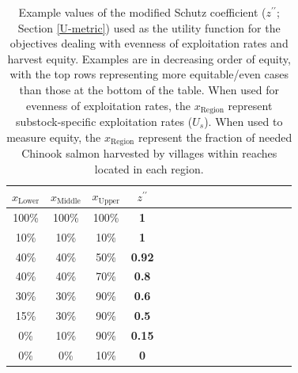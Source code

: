 \documentclass[12pt,]{book}
\theoremstyle{definition}
\theoremstyle{definition}
\theoremstyle{definition}
\theoremstyle{remark}
\begin{document}
\begin{singlespace}
\begin{table}
\caption{\label{tab:schutz-table}Example values of the modified Schutz coefficient ($z^{\prime\prime}$; Section \ref{U-metric}) used as the utility function for the objectives dealing with evenness of exploitation rates and harvest equity. Examples are in decreasing order of equity, with the top rows representing more equitable/even cases than those at the bottom of the table. When used for evenness of exploitation rates, the $x_{\text{Region}}$ represent substock-specific exploitation rates ($U_s$). When used to measure equity, the  $x_{\text{Region}}$ represent the fraction of needed Chinook salmon harvested by villages within reaches located in each region.}
\centering
\begin{tabular}[t]{ccc>{\bfseries}ccccccccccccc}
\toprule
$x_{\text{Lower}}$ & $x_{\text{Middle}}$ & $x_{\text{Upper}}$ & $z^{\prime\prime}$\\
\midrule
100\% & 100\% & 100\% & 1\\
10\% & 10\% & 10\% & 1\\
40\% & 40\% & 50\% & 0.92\\
40\% & 40\% & 70\% & 0.8\\
30\% & 30\% & 90\% & 0.6\\
15\% & 30\% & 90\% & 0.5\\
0\% & 10\% & 90\% & 0.15\\
0\% & 0\% & 10\% & 0\\
\bottomrule
\end{tabular}
\end{table}

\clearpage


\end{singlespace}
\end{document}
